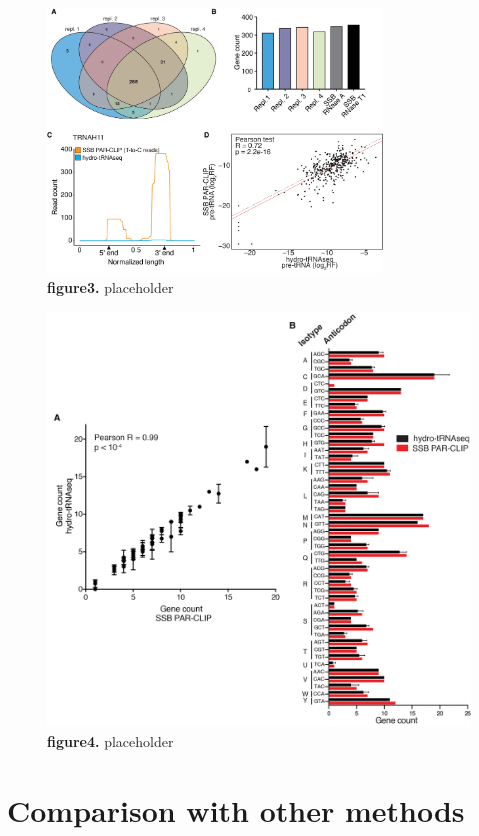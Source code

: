 \documentclass[12pt]{rockefeller}
\begin{document}
\begin{figure}[!ht]%
\centering
\includegraphics[width=3.5in]{paper3.png}%
\caption[figure3]
{\textbf{figure3.}
placeholder}
\centering
\label{paper3}%
\end{figure}


\begin{figure}[!ht]%
\centering
\includegraphics[width=\textwidth]{paper4_two.png}%
\caption[figure4]
{\textbf{figure4.}
placeholder}
\centering
\label{paper4}%
\end{figure}

\section{Comparison with other methods}
\end{document}
